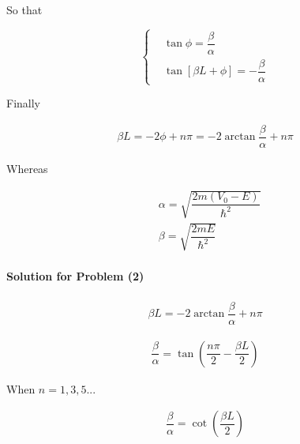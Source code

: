 \documentclass{article}
\begin{document}
So that

\begin{equation*}
  \left\{
  \begin{aligned}
    & \tan \phi = \dfrac{\beta}{\alpha}  \\
    & \tan \left[ \beta L + \phi \right] = - \dfrac{\beta}{\alpha} 
  \end{aligned}
  \right.
\end{equation*}

Finally

\begin{equation*}
  \begin{aligned}
    \beta L = - 2 \phi + n \pi = - 2 \arctan \dfrac{\beta}{\alpha} + n \pi
  \end{aligned}
\end{equation*}

Whereas

\begin{equation*}
  \begin{aligned}
    & \alpha = \sqrt{\dfrac{2 m \left( V_0 - E \right)}{\hbar^2} } \\
    & \beta = \sqrt{\dfrac{2 m E}{\hbar^2} }
  \end{aligned}
\end{equation*}

\paragraph{Solution for Problem (2)}

\begin{equation*}
  \begin{aligned}
    \beta L = - 2 \arctan \dfrac{\beta}{\alpha} + n \pi
  \end{aligned}
\end{equation*}

\begin{equation*}
  \begin{aligned}
    \dfrac{\beta}{\alpha} = \tan \left( \dfrac{n \pi}{2} - \dfrac{\beta L}{2}   \right) 
  \end{aligned}
\end{equation*}

When $n = 1,3,5...$

\begin{equation*}
  \begin{aligned}
    \dfrac{\beta}{\alpha} = \cot \left(\dfrac{\beta L}{2}   \right) 
  \end{aligned}
\end{equation*}
\end{document}
